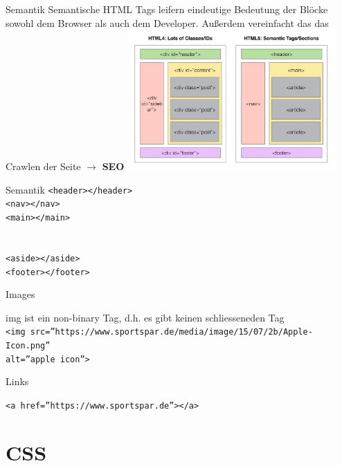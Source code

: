 \documentclass[12pt,xcolor={rgb}]{beamer}
\begin{document}
\begin{frame}{Semantik}
Semantische HTML Tags leifern eindeutige Bedeutung der Blöcke sowohl dem Browser als auch dem Developer. Außerdem vereinfacht das das Crawlen der Seite $\rightarrow$ \textbf{SEO}
\includegraphics[width=8cm]{imgs/sem_vikigncodeschool.JPG}
\end{frame}


\begin{frame}{Semantik}
\texttt{<header></header>}\\
\texttt{<nav></nav>}\\
\texttt{<main></main>}\\
\texttt{\color{red}{<section></section>}}\\
\texttt{\color{red}{<article></article>}}\\
\texttt{<aside></aside>}\\
\texttt{<footer></footer>}\\
\end{frame}


\begin{frame}{Images}

img ist ein non-binary Tag, d.h. es gibt keinen schliesseneden Tag\\
\vspace{0.5cm}
\texttt{<img src=''https://www.sportspar.de/media/image/15/07/2b/Apple-Icon.png''\\ alt=''apple icon''>}

\end{frame}

\begin{frame}{Links}

\vspace{0.5cm}
\texttt{<a href=''https://www.sportspar.de''></a>}
\end{frame}



\section{CSS}
\end{document}
